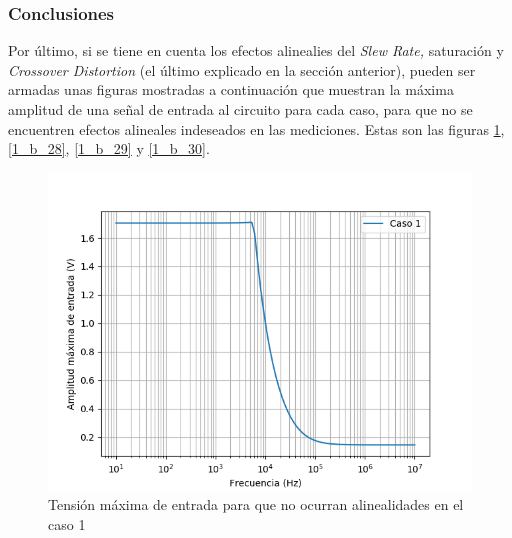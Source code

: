 \subsubsection{Conclusiones}

Por último, si se tiene en cuenta los efectos alinealies del \emph{Slew
Rate, }saturación y \emph{Crossover Distortion} (el último explicado
en la sección anterior), pueden ser armadas unas figuras mostradas
a continuación que muestran la máxima amplitud de una señal de entrada
al circuito para cada caso, para que no se encuentren efectos alineales
indeseados en las mediciones. Estas son las figuras \ref{1_b_27},
\ref{1_b_28}, \ref{1_b_29} y \ref{1_b_30}.

\begin{figure}[H]
\begin{centering}
\includegraphics[scale=0.5]{../Ex1/ib/Resources1b/AmplMaxVsFreq1}
\par\end{centering}
\caption{Tensión máxima de entrada para que no ocurran alinealidades en el
caso 1}
\label{1_b_27}

\end{figure}

